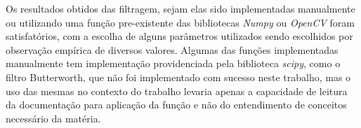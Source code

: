 \documentclass[conference]{IEEEtran}
\begin{document}
Os resultados obtidos das filtragem, sejam elas sido implementadas manualmente ou utilizando uma função pre-existente das bibliotecas \textit{Numpy} ou \textit{OpenCV} foram satisfatórios,
com a escolha de alguns parâmetros utilizados sendo escolhidos por observação empírica de diversos valores. Algumas das funções implementadas manualmente tem implementação providenciada pela biblioteca \textit{scipy}, 
como o filtro Butterworth, que não foi implementado com sucesso neste trabalho, mas o uso das mesmas no contexto do trabalho levaria apenas a capacidade de leitura da documentação para aplicação da função e não do entendimento de conceitos necessário da matéria. 


\end{document}
